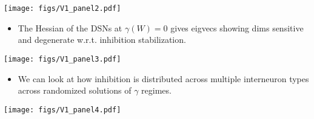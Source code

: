 \documentclass[landscape]{article}
\begin{document}
\begin{minipage}[c]{0.36\linewidth}
\begin{center}
\texttt{[image: figs/V1\_panel2.pdf]}
\end{center}

\begin{itemize}
\item The Hessian of the DSNs at $\gamma(W)=0$ gives eigvecs showing dims sensitive and degenerate w.r.t. inhibition stabilization.
\end{itemize}

\begin{center}
\texttt{[image: figs/V1\_panel3.pdf]}
\end{center}

\begin{itemize}
\item We can look at how inhibition is distributed across multiple interneuron types across randomized solutions of $\gamma$ regimes.
\end{itemize}

\begin{center}
\texttt{[image: figs/V1\_panel4.pdf]}
\end{center}

\end{minipage}
\end{document}
